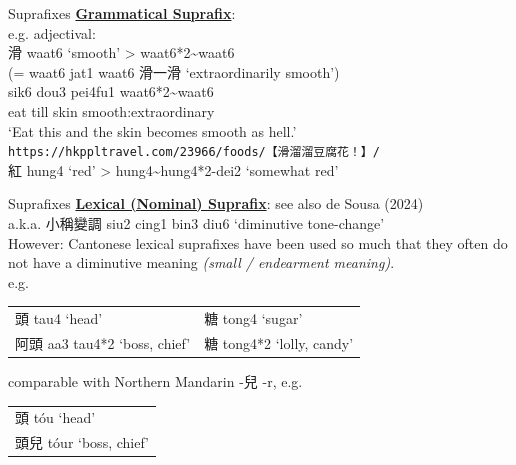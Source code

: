 \documentclass{beamer}
\begin{document}
\begin{frame}[fragile]{Suprafixes}
\textbf{\underline{Grammatical Suprafix}}:\\
\medskip
e.g. adjectival:\\
\medskip
滑 waat6 \enquote*{smooth} > waat6*2\~{}waat6\\ 
(= waat6 jat1 waat6 滑一滑 \enquote*{extraordinarily smooth})\\
\smallskip
sik6 dou3 pei4fu1 waat6*2\~{}waat6\\
eat till skin smooth:extraordinary\\
\enquote*{Eat this and the skin becomes smooth as hell.}\\
{\tiny \texttt{https://hkppltravel.com/23966/foods/【滑溜溜豆腐花！】/}}\\

\bigskip
紅 hung4 \enquote*{red} > hung4\~{}hung4*2-dei2 \enquote*{somewhat red}\\

\end{frame}

\begin{frame}[fragile]{Suprafixes}
\textbf{\underline{Lexical (Nominal) Suprafix}}: {\footnotesize see also de Sousa (2024)}\\
\smallskip
a.k.a. 小稱變調 siu2 cing1 bin3 diu6 \enquote*{diminutive tone-change}\\
{\scriptsize However: Cantonese lexical suprafixes have been used so much that they often do not have a diminutive meaning \emph{(small / endearment meaning)}.}\\
\medskip
e.g.\\ 
\begin{table}[]
    \flushleft
    \begin{tabular}{l l}
        頭 tau4 \enquote*{head} & 糖 tong4 \enquote*{sugar} \\
        阿頭 aa3 tau4*2 \enquote*{boss, chief} & 糖 tong4*2 \enquote*{lolly, candy}
    \end{tabular}
\end{table}

\medskip
comparable with Northern Mandarin -兒 -r, e.g.\\
\begin{table}[]
    \flushleft
    \begin{tabular}{l}
        頭 tóu \enquote*{head}\\
        頭兒 tóur \enquote*{boss, chief}
    \end{tabular}
\end{table}

\vfill {}

\end{frame}
\end{document}
